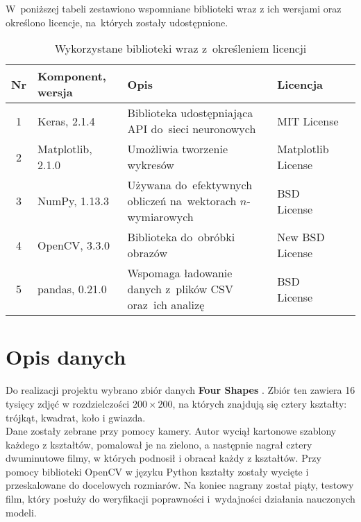 \documentclass[11pt,a4paper]{article}
\begin{document}
W~poniższej tabeli zestawiono wspomniane biblioteki wraz z ich wersjami oraz określono licencje, na~których zostały udostępnione.
\begin{table}[H]
    \begin{tabularx}{\textwidth}{|c|l|X|l|c|}
        \hline
        \textbf{Nr} & \textbf{Komponent, wersja} & \textbf{Opis} & \textbf{Licencja} & \\
        \hline
        \hline
        1 &
        Keras, 2.1.4 &
        Biblioteka udostępniająca API do~sieci neuronowych &
        MIT License &
        \cite{keras} \\
        \hline
        2 & 
        Matplotlib, 2.1.0 & 
        Umożliwia tworzenie wykresów &
        Matplotlib License &
        \cite{matplotlib} \\
        \hline
        3 & 
        NumPy, 1.13.3 &
        Używana do~efektywnych obliczeń na~wektorach $n$-wymiarowych &
        BSD License &
        \cite{numpy} \\
        \hline
        4 & 
        OpenCV, 3.3.0 &
        Biblioteka do~obróbki obrazów &
        New BSD License &
        \cite{opencv} \\
        \hline
        5 &
        pandas, 0.21.0 &
        Wspomaga ładowanie danych z~plików CSV oraz~ich analizę &
        BSD License &
        \cite{pandas} \\
        \hline
    \end{tabularx}
    \caption{Wykorzystane biblioteki wraz z~określeniem licencji}
\end{table}

\section{Opis danych}

Do realizacji projektu wybrano zbiór danych \textbf{Four Shapes} \cite{shapes}. Zbiór ten zawiera 16 tysięcy zdjęć w rozdzielczości $200 \times 200$, na których znajdują się cztery kształty: trójkąt, kwadrat, koło i gwiazda.\\

Dane zostały zebrane przy pomocy kamery. Autor wyciął kartonowe szablony każdego z kształtów, pomalował je na zielono, a następnie nagrał cztery dwuminutowe filmy, w których podnosił i obracał każdy z kształtów. Przy pomocy biblioteki OpenCV w języku Python kształty zostały wycięte i przeskalowane do docelowych rozmiarów. Na koniec nagrany został piąty, testowy film, który posłuży do weryfikacji poprawności i~wydajności działania nauczonych modeli.\\
\end{document}
